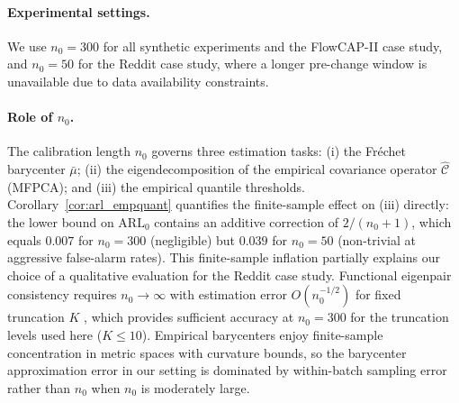 \documentclass{article}
\theoremstyle{plain}
\theoremstyle{definition}
\theoremstyle{remark}
\begin{document}
\paragraph{Experimental settings.}
We use $n_0 = 300$ for all synthetic experiments and the FlowCAP-II case study, and $n_0 = 50$ for the Reddit case study, where a longer pre-change window is unavailable due to data availability constraints.

\paragraph{Role of $n_0$.}
The calibration length $n_0$ governs three estimation tasks: (i) the Fr\'echet barycenter $\bar{\mu}$; (ii) the eigendecomposition of the empirical covariance operator $\widehat{\mathcal{C}}$ (MFPCA); and (iii) the empirical quantile thresholds. Corollary~\ref{cor:arl_empquant} quantifies the finite-sample effect on (iii) directly: the lower bound on $\mathrm{ARL}_0$ contains an additive correction of $2/(n_0+1)$, which equals $0.007$ for $n_0=300$ (negligible) but $0.039$ for $n_0=50$ (non-trivial at aggressive false-alarm rates). This finite-sample inflation partially explains our choice of a qualitative evaluation for the Reddit case study.
Functional eigenpair consistency requires $n_0 \to \infty$ with estimation error $O(n_0^{-1/2})$ for fixed truncation $K$ \citep{hall2006properties}, which provides sufficient accuracy at $n_0 = 300$ for the truncation levels used here ($K \le 10$). Empirical barycenters enjoy finite-sample concentration in metric spaces with curvature bounds, so the barycenter approximation error in our setting is dominated by within-batch sampling error rather than $n_0$ when $n_0$ is moderately large.
\end{document}
